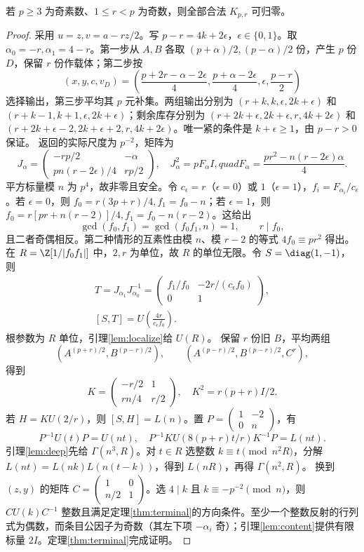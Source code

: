 \begin{proposition}\label{prop:odd}
若 $p\ge3$ 为奇素数、$1\le r<p$ 为奇数，则全部合法 $K_{p,r}$ 可归零。
\end{proposition}
\begin{proof}
采用 $u=z,v=a-rz/2$。写 $p-r=4k+2\epsilon$，$\epsilon\in\{0,1\}$。取 $\alpha_0=-r,\alpha_1=4-r$。第一步从 $A,B$ 各取 $(p+\alpha)/2,(p-\alpha)/2$ 份，产生 $p$ 份 $D$，保留 $r$ 份作载体；第二步按
\[
(x,y,c,v_D)=\left(\frac{p+2r-\alpha-2\epsilon}{4},\frac{p+\alpha-2\epsilon}{4},\epsilon,\frac{p-r}{2}\right)
\]
选择输出，第三步平均其 $p$ 元补集。两组输出分别为 $(r+k,k,\epsilon,2k+\epsilon)$ 和 $(r+k-1,k+1,\epsilon,2k+\epsilon)$；剩余库存分别为 $(r+2k+\epsilon,2k+\epsilon,r,4k+2\epsilon)$ 和 $(r+2k+\epsilon-2,2k+\epsilon+2,r,4k+2\epsilon)$。唯一紧的条件是 $k+\epsilon\ge1$，由 $p-r>0$ 保证。
返回的实际尺度为 $p^{-2}$，矩阵为
\[
J_\alpha=\begin{pmatrix}-rp/2&-\alpha\\pn(r-2\epsilon)/4&rp/2\end{pmatrix},
\quad J_\alpha^2=pF_\alpha I,quad F_\alpha=\frac{pr^2-n(r-2\epsilon)\alpha}{4}.
\]
平方标量模 $n$ 为 $p^4$，故非零且安全。令 $c_\epsilon=r$（$\epsilon=0$）或 $1$（$\epsilon=1$），$f_i=F_{\alpha_i}/c_\epsilon$。若 $\epsilon=0$，则 $f_0=r(3p+r)/4,f_1=f_0-n$；若 $\epsilon=1$，则 $f_0=r[pr+n(r-2)]/4,f_1=f_0-n(r-2)$。这给出
\[
\gcd(f_0,f_1)=\gcd(f_0f_1,n)=1,\qquad r\mid f_0,
\]
且二者奇偶相反。第二种情形的互素性由模 $n$、模 $r-2$ 的等式 $4f_0\equiv pr^2$ 得出。
在 $R=\Z[1/|f_0f_1|]$ 中，$2,r$ 为单位，故 $R$ 的单位无限。令 $S=\diag(1,-1)$，则
\begin{gather*}
T=J_{\alpha_1}J_{\alpha_0}^{-1}
=\begin{pmatrix}f_1/f_0&-2r/(c_\epsilon f_0)\\0&1\end{pmatrix},\\
[S,T]=U\left(\frac{4r}{c_\epsilon f_0}\right).
\end{gather*}
根参数为 $R$ 单位，引理\ref{lem:localize}给 $U(R)$。
保留 $r$ 份旧 $B$，平均两组
\[
(A^{(p+r)/2},B^{(p-r)/2}),\qquad
(A^{(p-r)/2},B^{(p-r)/2},C^r),
\]
得到
\[
K=\begin{pmatrix}-r/2&1\\rn/4&r/2\end{pmatrix},\quad K^2=r(p+r)I/2.
\]
若 $H=KU(2/r)$，则 $[S,H]=L(n)$。置 $P=\left(\begin{smallmatrix}1&-2\\0&n\end{smallmatrix}\right)$，有
\[
P^{-1}U(t)P=U(nt),\quad
P^{-1}KU(8(p+r)t/r)K^{-1}P=L(nt).
\]
引理\ref{lem:deep}先给 $\Gamma(n^3,R)$。对 $t\in R$ 选整数 $k\equiv t\pmod{n^2R}$，分解 $L(nt)=L(nk)L(n(t-k))$，得到 $L(nR)$，再得 $\Gamma(n^2,R)$。
换到 $(z,y)$ 的矩阵 $C=\left(\begin{smallmatrix}1&0\\n/2&1\end{smallmatrix}\right)$。选 $4\mid k$ 且 $k\equiv-p^{-2}\pmod n$，则 $CU(k)C^{-1}$ 整数且满足定理\ref{thm:terminal}的方向条件。至少一个整数反射的行列式为偶数，而条目公因子为奇数（其左下项 $-\alpha_i$ 奇）；引理\ref{lem:content}提供有限标量 $2I$。定理\ref{thm:terminal}完成证明。
\end{proof}

